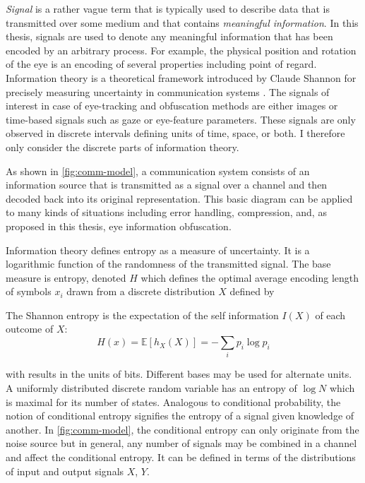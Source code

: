 \textit{Signal} is a rather vague term that is typically used to describe data that is transmitted over some medium and that contains \textit{meaningful information}. In this thesis, signals are used to denote any meaningful information that has been encoded by an arbitrary process. For example, the physical position and rotation of the eye is an encoding of several properties including point of regard. Information theory is a theoretical framework introduced by Claude Shannon for precisely measuring uncertainty in communication systems \parencite{shannon1948mathematical}. The signals of interest in case of eye-tracking and obfuscation methods are either images or time-based signals such as gaze or eye-feature parameters. These signals are only observed in discrete intervals defining units of time, space, or both. I therefore only consider the discrete parts of information theory. 

As shown in \cref{fig:comm-model}, a communication system consists of an information source that is transmitted as a signal over a channel and then decoded back into its original representation. This basic diagram can be applied to many kinds of situations including error handling, compression, and, as proposed in this thesis, eye information obfuscation.


Information theory defines entropy as a measure of uncertainty. It is a logarithmic function of the randomness of the transmitted signal. 
The base measure is entropy, denoted $H$ which defines the optimal average encoding length of symbols $x_i$ drawn from a discrete distribution $X$ defined by
\begin{definition}
The Shannon entropy is the expectation of the self information $I(X)$ of each outcome of $X$:
\begin{equation}
    H(x) = \mathbb{E}[h_X(X)] = - \sum_i p_i\log p_i
\end{equation}
\end{definition}

with results in the units of bits. Different bases may be used for alternate units. A uniformly distributed discrete random variable has an entropy of $\log{N}$ which is maximal for its number of states. Analogous to conditional probability, the notion of conditional entropy signifies the entropy of a signal given knowledge of another. In \cref{fig:comm-model}, the conditional entropy can only originate from the noise source but in general, any number of signals may be combined in a channel and affect the conditional entropy. It can be defined in terms of the distributions of input and output signals $X$, $Y$.

